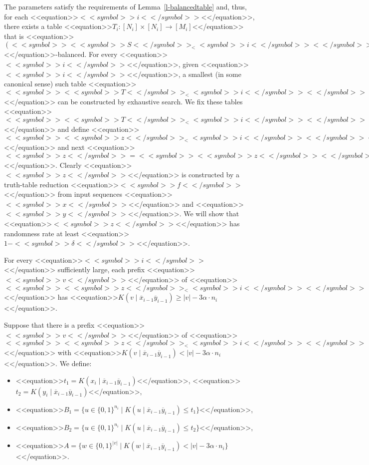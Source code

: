 \documentclass[proceedings]{stacs}
\def\zo{\{0,1\}}
\def\mapping{\rightarrow}
\newcommand{\barx}{\overline{x}}
\newcommand{\bary}{\overline{y}}
\newcommand{\barxy}{\barx_{i-1}\bary_{i-1}}
\begin{document}
The parameters satisfy the requirements of Lemma~\ref{l-balancedtable} and, thus, for each <<equation>>$<<symbol>>i<</symbol>>$<</equation>>, there exists a table <<equation>>$T_i : [N_i] \times [N_i] \mapping[M_i]$<</equation>> that is <<equation>>$(<<symbol>><<symbol>>S<</symbol>>_<<symbol>>i<</symbol>><</symbol>>, <<symbol>><<symbol>>D<</symbol>>_<<symbol>>i<</symbol>><</symbol>>)$<</equation>>-balanced. For every <<equation>>$<<symbol>>i<</symbol>>$<</equation>>, given <<equation>>$<<symbol>>i<</symbol>>$<</equation>>, a smallest (in some canonical sense) such table <<equation>>$<<symbol>><<symbol>>T<</symbol>>_<<symbol>>i<</symbol>><</symbol>>$<</equation>> can be constructed by exhaustive search. We fix these tables <<equation>>$<<symbol>><<symbol>>T<</symbol>>_<<symbol>>i<</symbol>><</symbol>>$<</equation>> and define <<equation>>$<<symbol>><<symbol>>z<</symbol>>_<<symbol>>i<</symbol>><</symbol>> = <<symbol>><<symbol>>T<</symbol>>_<<symbol>>i<</symbol>><</symbol>>(<<symbol>><<symbol>>x<</symbol>>_<<symbol>>i<</symbol>><</symbol>>, <<symbol>><<symbol>>y<</symbol>>_<<symbol>>i<</symbol>><</symbol>>)$<</equation>> and next <<equation>>$<<symbol>>z<</symbol>> = <<symbol>><<symbol>>z<</symbol>><</symbol>>_1 <<symbol>><<symbol>>z<</symbol>><</symbol>>_2 \ldots <<symbol>><<symbol>>z<</symbol>>_<<symbol>>i<</symbol>><</symbol>> \ldots$<</equation>>. Clearly <<equation>>$<<symbol>>z<</symbol>>$<</equation>> is constructed by a truth-table reduction <<equation>>$<<symbol>>f<</symbol>>$<</equation>> from input sequences <<equation>>$<<symbol>>x<</symbol>>$<</equation>> and <<equation>>$<<symbol>>y<</symbol>>$<</equation>>. We will show that <<equation>>$<<symbol>>z<</symbol>>$<</equation>> has randomness rate at least <<equation>>$1 - <<symbol>>\delta<</symbol>>$<</equation>>.
\begin{lemma}
\label{l:block}
For every <<equation>>$<<symbol>>i<</symbol>>$<</equation>> sufficiently large, each prefix <<equation>>$<<symbol>>v<</symbol>>$<</equation>> of <<equation>>$<<symbol>><<symbol>>z<</symbol>>_<<symbol>>i<</symbol>><</symbol>>$<</equation>> has <<equation>>$K(v \mid \barxy) \geq |v| - 3\alpha \cdot n_i$<</equation>>.
\end{lemma}
\proof
Suppose that there is a prefix <<equation>>$<<symbol>>v<</symbol>>$<</equation>> of <<equation>>$<<symbol>><<symbol>>z<</symbol>>_<<symbol>>i<</symbol>><</symbol>>$<</equation>> with <<equation>>$K(v \mid \barxy) < |v| - 3\alpha \cdot n_i$<</equation>>. We define:
\begin{itemize}
	\item <<equation>>$t_1 = K(x_i \mid \barxy)$<</equation>>, <<equation>>$t_2 = K(y_i \mid \barxy)$<</equation>>,
	\item <<equation>>$B_1 = \{u \in \zo^{n_i} \mid K(u \mid \barxy) \leq t_1 \}$<</equation>>, 
	
	\item <<equation>>$B_2 = \{u \in \zo^{n_i} \mid K(u \mid \barxy) \leq t_2 \}$<</equation>>,
	\item <<equation>>$A= \{w \in \zo^{|v|} \mid K(w \mid \barxy) < |v| - 3 \alpha \cdot n_i\}$<</equation>>.
\end{itemize}
\end{document}
